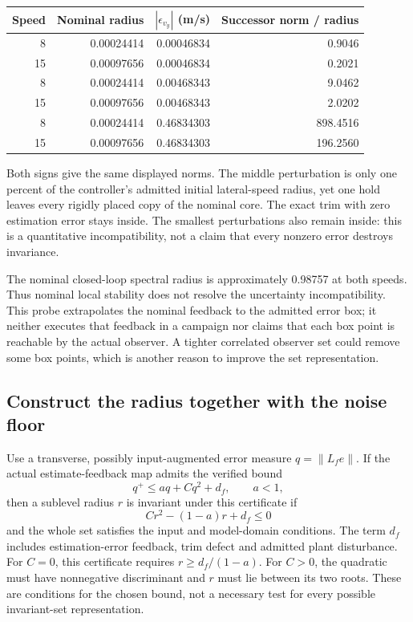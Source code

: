\documentclass[11pt]{article}
\begin{document}
\begin{center}
\begin{tabular}{rrrr}
\toprule
Speed & Nominal radius & $|\epsilon_{v_y}|$ (m/s) & Successor norm / radius\\
\midrule
8 & 0.00024414 & 0.00046834 & 0.9046\\
15 & 0.00097656 & 0.00046834 & 0.2021\\
8 & 0.00024414 & 0.00468343 & 9.0462\\
15 & 0.00097656 & 0.00468343 & 2.0202\\
8 & 0.00024414 & 0.46834303 & 898.4516\\
15 & 0.00097656 & 0.46834303 & 196.2560\\
\bottomrule
\end{tabular}
\end{center}
Both signs give the same displayed norms. The middle perturbation is only
one percent of the controller's admitted initial lateral-speed radius, yet
one hold leaves every rigidly placed copy of the nominal core. The exact
trim with zero estimation error stays inside. The smallest perturbations
also remain inside: this is a quantitative incompatibility, not a claim that
every nonzero error destroys invariance.

The nominal closed-loop spectral radius is approximately 0.98757 at both
speeds. Thus nominal local stability does not resolve the uncertainty
incompatibility. This probe extrapolates the nominal feedback to the
admitted error box; it neither executes that feedback in a campaign nor
claims that each box point is reachable by the actual observer. A tighter
correlated observer set could remove some box points, which is another
reason to improve the set representation.

\subsection{Construct the radius together with the noise floor}
Use a transverse, possibly input-augmented error measure $q=\|L_fe\|$.
If the actual estimate-feedback map admits the verified bound
\begin{equation}
 q^+\le a q+Cq^2+d_f,\qquad a<1,
\end{equation}
then a sublevel radius $r$ is invariant under this certificate if
\begin{equation}\label{eq:radius}
 Cr^2-(1-a)r+d_f\le0
\end{equation}
and the whole set satisfies the input and model-domain conditions. The term
$d_f$ includes estimation-error feedback, trim defect and admitted plant
disturbance. For $C=0$, this certificate requires $r\ge d_f/(1-a)$.
For $C>0$, the quadratic must have nonnegative discriminant and $r$ must
lie between its two roots. These are conditions for the chosen bound, not
a necessary test for every possible invariant-set representation.
\end{document}
